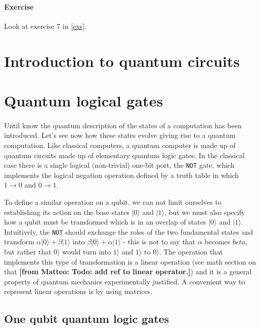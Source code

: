 \documentclass[a4paper,10pt]{article}
\newcommand{\from}[2]{{\bf[{\sc from #1:} #2]}}
\begin{document}
\paragraph{Exercise} Look at exercise 7 in \autoref{exs}.

\newpage

\section*{Introduction to quantum circuits}

\section{Quantum logical gates} 
\label{sec:section5}
\paragraph{} Until know the quantum description of the states of a computation has been introduced. Let's see now how these states evolve giving rise to a quantum computation. Like classical computers, a quantum computer is made up of quantum circuits made up of elementary quantum logic gates. In the classical case there is a single logical (non-trivial) one-bit port, the \texttt{NOT} gate, which implements the logical negation operation defined by a truth table in which $1 \rightarrow{} 0$ and $0 \rightarrow{} 1$.

To define a similar operation on a qubit, we can not limit ourselves to establishing its action on the base states $|0\rangle$ and $|1\rangle$, but we must also specify how a qubit must be transformed which is in an overlap of states $|0\rangle$ and $|1\rangle$. Intuitively, the \texttt{NOT} should exchange the roles of the two fundamental states and transform $\alpha|0\rangle + \beta|1\rangle$ into $\beta|0\rangle + \alpha|1\rangle$ - this is not to say that $\alpha$ becomes $beta$, but rather that $0\rangle$ would turn into $1\rangle$ and $1\rangle$ to $0\rangle$. The operation that implements this type of transformation is a linear operation (see math section on that \from{Matteo}{Todo: add ref to linear operator.}) and it is a general property of quantum mechanics experimentally justified. A convenient way to represent linear operations is by using matrices.

\subsection{One qubit quantum logic gates}
\end{document}
